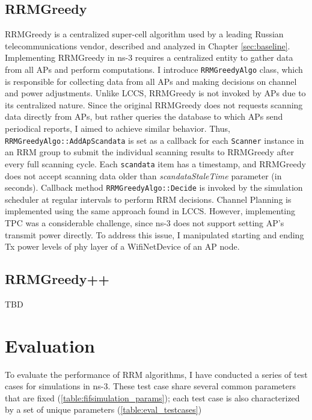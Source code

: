 \subsection{RRMGreedy}
\label{chap:impl:sec:implementation:rrmgreedy}
RRMGreedy is a centralized super-cell algorithm used by a leading Russian telecommunications vendor, described and analyzed in Chapter \ref{sec:baseline}.
Implementing RRMGreedy in ns-3 requires a centralized entity to gather data from all APs and perform computations. I introduce \texttt{RRMGreedyAlgo} class, which is responsible for collecting data from all APs and making decisions on channel and power adjustments.
Unlike LCCS, RRMGreedy is not invoked by APs due to its centralized nature. Since the original RRMGreedy does not requests scanning data directly from APs, but rather queries the database to which APs send periodical reports, I aimed to achieve similar behavior.
Thus, \texttt{RRMGreedyAlgo::AddApScandata} is set as a callback for each \texttt{Scanner} instance in an RRM group to submit the individual scanning results to RRMGreedy after every full scanning cycle. Each \texttt{scandata} item has a timestamp, and RRMGreedy does not accept scanning data older than \textit{scandataStaleTime} parameter (in seconds). Callback method \texttt{RRMGreedyAlgo::Decide} is invoked by the simulation scheduler at regular intervals to perform RRM decisions.
Channel Planning is implemented using the same approach found in LCCS. However, implementing TPC was a considerable challenge, since ns-3 does not support setting AP's transmit power directly. To address this issue, I manipulated starting and ending Tx power levels of phy layer of a WifiNetDevice of an AP node.

\subsection{RRMGreedy++}
\label{chap:impl:sec:implementation:rrmv2}

TBD

\section{Evaluation}
\label{chap:impl:sec:eval}
To evaluate the performance of RRM algorithms, I have conducted a series of test cases for simulations in ns-3. These test case share several common parameters that are fixed (\autoref{table:fifsimulation_params}); each test case is also characterized by a set of unique parameters (\autoref{table:eval_testcases})

